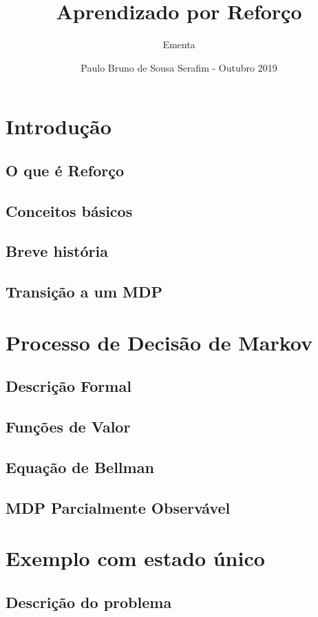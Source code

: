 \documentclass{article}
\title{Aprendizado por Reforço}
\author{Ementa}
\date{Paulo Bruno de Sousa Serafim - Outubro 2019}
\begin{document}
\maketitle

\section{Introdução}

    \subsection{O que é Reforço}
    \subsection{Conceitos básicos}
    \subsection{Breve história}
    \subsection{Transição a um MDP}

\section{Processo de Decisão de Markov}

    \subsection{Descrição Formal}
    \subsection{Funções de Valor}
    \subsection{Equação de Bellman}
    \subsection{MDP Parcialmente Observável}

\section{Exemplo com estado único}

    \subsection{Descrição do problema}
\end{document}
